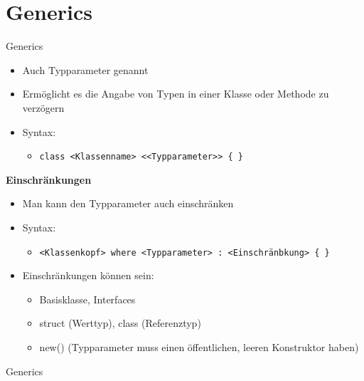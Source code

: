 \section{Generics}
\begin{frame}{Generics}
	\begin{itemize}
		\item Auch Typparameter genannt
		\item Ermöglicht es die Angabe von Typen in einer Klasse oder Methode zu verzögern
		\item Syntax:
		\begin{itemize}
			\item \texttt{class \alert{<Klassenname>} <\alert{<Typparameter>}> \{ \}}
		\end{itemize}
	\end{itemize}
	\textbf{Einschränkungen}\\
	\begin{itemize}
		\item Man kann den Typparameter auch einschränken
		\item Syntax:
		\begin{itemize}
			\item \texttt{\alert{<Klassenkopf>} where \alert{<Typparameter>} : \alert{<Einschränbkung>} \{ \}}
		\end{itemize}
		\item Einschränkungen können sein:
		\begin{itemize}
			\item Basisklasse, Interfaces
			\item struct (Werttyp), class (Referenztyp)
			\item new() (Typparameter muss einen öffentlichen, leeren Konstruktor haben)
		\end{itemize}
	\end{itemize}
\end{frame}

\begin{frame}{Generics}
	
	
\end{frame}


